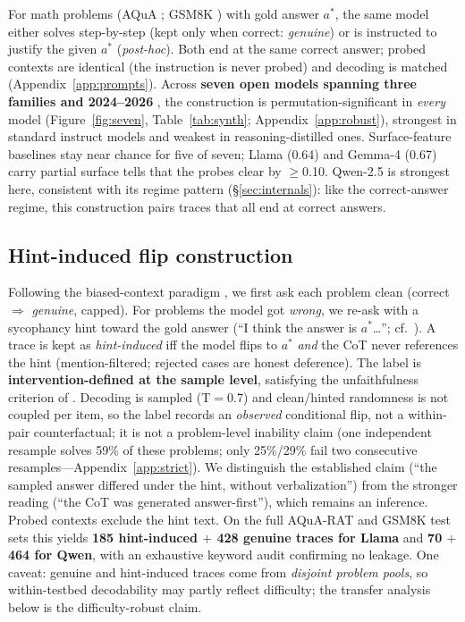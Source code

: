 \documentclass[11pt]{article}
\begin{document}
For math problems (AQuA \citep{ling2017aqua}; GSM8K \citep{cobbe2021gsm8k}) with gold answer $a^*$, the same model either solves step-by-step (kept only when correct: \emph{genuine}) or is instructed to justify the given $a^*$ (\emph{post-hoc}). Both end at the same correct answer; probed contexts are identical (the instruction is never probed) and decoding is matched (Appendix~\ref{app:prompts}). Across \textbf{seven open models spanning three families and 2024--2026} \citep{grattafiori2024llama3,qwen2025qwen25,gemmateam2024gemma2,deepseek2025r1}, the construction is permutation-significant in \emph{every} model (Figure~\ref{fig:seven}, Table~\ref{tab:synth}; Appendix~\ref{app:robust}), strongest in standard instruct models and weakest in reasoning-distilled ones. Surface-feature baselines stay near chance for five of seven; Llama (0.64) and Gemma-4 (0.67) carry partial surface tells that the probes clear by $\geq$0.10. Qwen-2.5 is strongest here, consistent with its regime pattern (\S\ref{sec:internals}): like the correct-answer regime, this construction pairs traces that all end at correct answers.

\subsection{Hint-induced flip construction}
\label{sec:hint}

Following the biased-context paradigm \citep{turpin2023language,chen2025reasoning}, we first ask each problem clean (correct $\Rightarrow$ \emph{genuine}, capped). For problems the model got \emph{wrong}, we re-ask with a sycophancy hint toward the gold answer (``I think the answer is $a^*$\ldots''; cf.\ \citealp{sharma2023sycophancy}). A trace is kept as \emph{hint-induced} iff the model flips to $a^*$ \emph{and} the CoT never references the hint (mention-filtered; rejected cases are honest deference). The label is \textbf{intervention-defined at the sample level}, satisfying the unfaithfulness criterion of \citet{chen2025reasoning}. Decoding is sampled (T$=$0.7) and clean/hinted randomness is not coupled per item, so the label records an \emph{observed} conditional flip, not a within-pair counterfactual; it is not a problem-level inability claim (one independent resample solves 59\% of these problems; only 25\%/29\% fail two consecutive resamples---Appendix~\ref{app:strict}). We distinguish the established claim (``the sampled answer differed under the hint, without verbalization'') from the stronger reading (``the CoT was generated answer-first''), which remains an inference. Probed contexts exclude the hint text. On the full AQuA-RAT and GSM8K test sets this yields \textbf{185 hint-induced $+$ 428 genuine traces for Llama} and \textbf{70 $+$ 464 for Qwen}, with an exhaustive keyword audit confirming no leakage. One caveat: genuine and hint-induced traces come from \emph{disjoint problem pools}, so within-testbed decodability may partly reflect difficulty; the transfer analysis below is the difficulty-robust claim.
\end{document}
